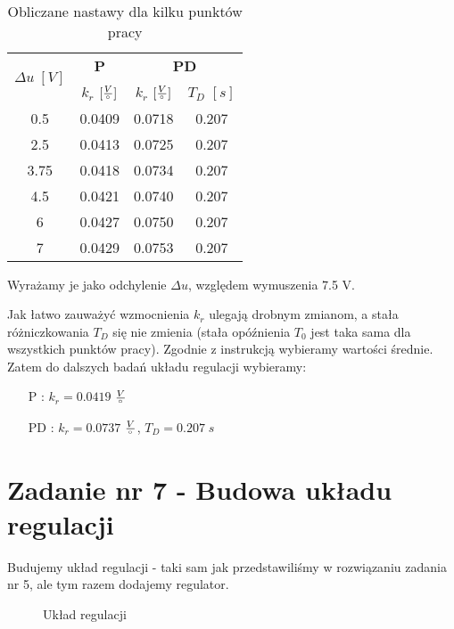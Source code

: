 \documentclass[11 pt]{article}
\begin{document}
\begin{table}[h!]
	\center
	\begin{tabular}{|c|c|c|c|}
	\hline
	\multirow{2}{*}{$\Delta u \; [V]$} & \textbf{P} & \multicolumn{2}{c|}{\textbf{PD}}\\
	\cline{2-4}
	& $k_r$ $[\frac{V}{\degree}]$ & $k_r$ $[\frac{V}{\degree}]$ & $T_D$ $[s]$\\
	\hline
	0.5 & 0.0409 & 0.0718 & 0.207\\
	2.5 & 0.0413 & 0.0725 & 0.207\\
	3.75 & 0.0418 & 0.0734 & 0.207\\
	4.5 & 0.0421 & 0.0740 & 0.207\\
	6 & 0.0427 & 0.0750 & 0.207\\
	7 & 0.0429 & 0.0753 & 0.207\\
	\hline
	\end{tabular}
	\caption{Obliczane nastawy dla kilku punktów pracy}
	Wyrażamy je jako odchylenie $\Delta u$, względem wymuszenia 7.5 V.
	\label{tb:nastawy}
\end{table}

Jak łatwo zauważyć wzmocnienia $k_r$ ulegają drobnym zmianom, a stała różniczkowania $T_D$ się nie zmienia (stała opóźnienia $T_0$ jest taka sama dla wszystkich punktów pracy). Zgodnie z instrukcją wybieramy wartości średnie. Zatem do dalszych badań układu regulacji wybieramy:

\begin{itemize}
\item[P]: $k_r = 0.0419$ $\frac{V}{\degree}$
\item[PD]: $k_r = 0.0737$ $\frac{V}{\degree}$, $T_D = 0.207 \; s$
\end{itemize}

\newpage

\setcounter{section}{7}
\setcounter{figure}{0}
\section*{Zadanie nr 7 - Budowa układu regulacji}

Budujemy układ regulacji - taki sam jak przedstawiliśmy w rozwiązaniu zadania nr 5, ale tym razem dodajemy regulator.

\begin{figure}[h!]
	\centerline{
	}
	\caption{Układ regulacji}
\end{figure}
\end{document}
